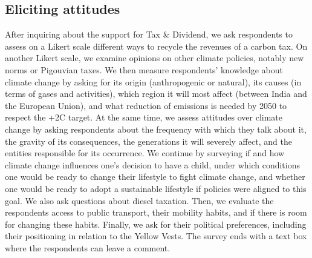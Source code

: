 \documentclass[english,5p,authoryear]{elsarticle}
\begin{document}

    \subsection{Eliciting attitudes} %


After inquiring about the support for Tax \& Dividend, we ask respondents to assess on a Likert scale different ways to recycle the revenues of a carbon tax. On another Likert scale, we examine opinions on other climate policies, notably new norms or Pigouvian taxes. We then measure respondents' knowledge about climate change by asking for its origin (anthropogenic or natural), its causes (in terms of gases and activities), which region it will most affect (between India and the European Union), and what reduction of emissions is needed by 2050 to respect the +2\textdegree{}C target. At the same time, we assess attitudes over climate change by asking respondents about the frequency with which they talk about it, the gravity of its consequences, the generations it will severely affect, and the entities responsible for its occurrence. We continue by surveying if and how climate change influences one's decision to have a child, under which conditions one would be ready to change their lifestyle to fight climate change, and whether one would be ready to adopt a sustainable lifestyle if policies were aligned to this goal. We also ask questions about diesel taxation. Then, we evaluate the respondents access to public transport, their mobility habits, and if there is room for changing these habits. Finally, we ask for their political preferences, including their positioning in relation to the Yellow Vests. The survey ends with a text box where the respondents can leave a comment.
\end{document}
